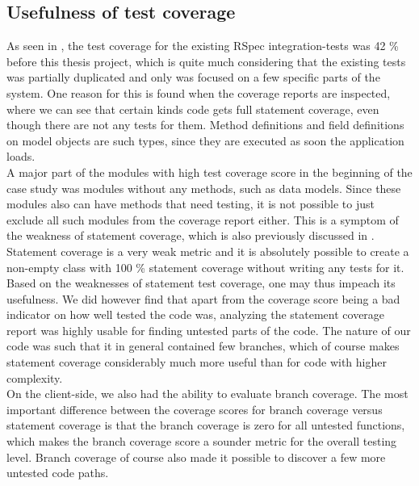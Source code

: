 
\subsection{Usefulness of test coverage}

As seen in , the test coverage for the
existing RSpec integration-tests was 42 \% before this thesis project,
which is quite much considering that the existing tests was partially
duplicated and only was focused on a few specific parts of the system.
One reason for this is found when the coverage reports are inspected,
where we can see that certain kinds code gets full statement coverage,
even though there are not any tests for them. Method definitions and
field definitions on model objects are such types, since they are
executed as soon the application loads.\\

A major part of the modules with high test coverage score in the
beginning of the case study was modules without any methods, such as
data models. Since these modules also can have methods that need
testing, it is not possible to just exclude all such modules from the
coverage report either. This is a symptom of the weakness of statement
coverage, which is also previously discussed in
. Statement coverage is a very weak
metric and it is absolutely possible to create a non-empty class with
100 \% statement coverage without writing any tests for it.\\

Based on the weaknesses of statement test coverage, one may thus impeach
its usefulness. We did however find that apart from the coverage score
being a bad indicator on how well tested the code was, analyzing the
statement coverage report was highly usable for finding untested parts
of the code. The nature of our code was such that it in general
contained few branches, which of course makes statement coverage
considerably much more useful than for code with higher complexity.\\

On the client-side, we also had the ability to evaluate branch coverage.
The most important difference between the coverage scores for branch
coverage versus statement coverage is that the branch coverage is zero
for all untested functions, which makes the branch coverage score a
sounder metric for the overall testing level. Branch coverage of course
also made it possible to discover a few more untested code paths.\\


